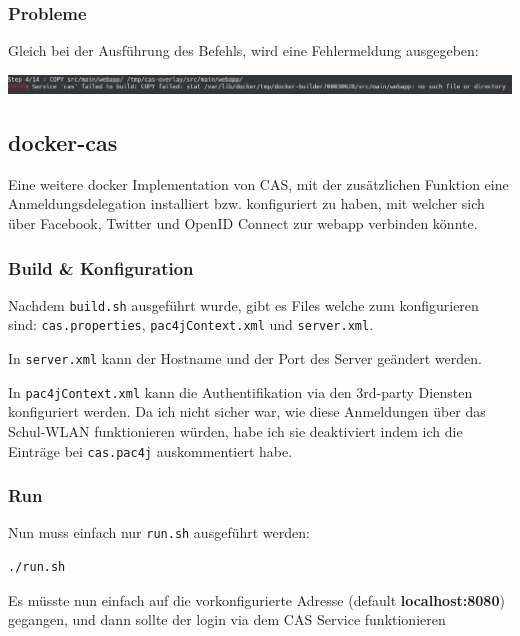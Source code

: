 \subsubsection{Probleme}
Gleich bei der Ausführung des Befehls, wird eine Fehlermeldung ausgegeben:

\begin{minipage}{\linewidth}
	\centering
	\includegraphics[width=1\linewidth]{images/failed_2}
\end{minipage}

\subsection{docker-cas}
\cite{Terranex}

Eine weitere docker Implementation von CAS, mit der zusätzlichen Funktion eine Anmeldungsdelegation installiert bzw. konfiguriert zu haben, mit welcher sich über Facebook, Twitter und OpenID Connect zur webapp verbinden könnte.

\subsubsection{Build \& Konfiguration}
Nachdem \verb|build.sh| ausgeführt wurde, gibt es Files welche zum konfigurieren sind: \verb|cas.properties|, \verb|pac4jContext.xml| und \verb|server.xml|.

In \verb|server.xml| kann der Hostname und der Port des Server geändert werden.

In \verb|pac4jContext.xml| kann die Authentifikation via den 3rd-party Diensten konfiguriert werden. Da ich nicht sicher war, wie diese Anmeldungen über das Schul-WLAN funktionieren würden, habe ich sie deaktiviert indem ich die Einträge bei \verb|cas.pac4j| auskommentiert habe.

\subsubsection{Run}
Nun muss einfach nur \verb|run.sh| ausgeführt werden:

\begin{lstlisting}[language=bash]
./run.sh
\end{lstlisting}

Es müsste nun einfach auf die vorkonfigurierte Adresse (default \textbf{localhost:8080}) gegangen, und dann sollte der login via dem CAS Service funktionieren

